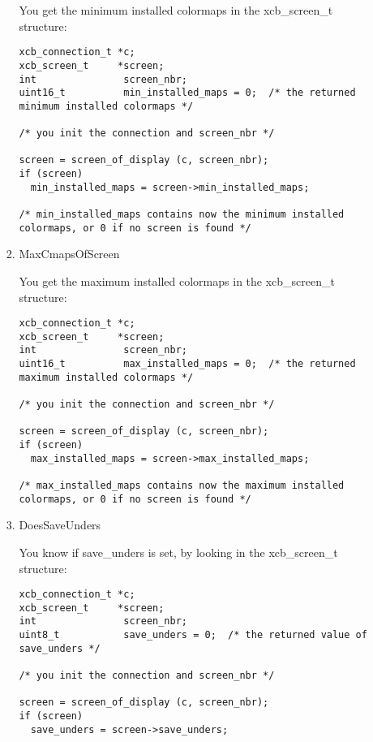 \documentclass[12pt,oneside,titlepage]{book}
\begin{document}
\begin{enumerate}
\begin{enumerate}
\begin{enumerate}
      You get the minimum installed colormaps in the {xcb\_screen\_t}
      structure:

\begin{verbatim}
xcb_connection_t *c;
xcb_screen_t     *screen;
int               screen_nbr;
uint16_t          min_installed_maps = 0;  /* the returned minimum installed colormaps */

/* you init the connection and screen_nbr */

screen = screen_of_display (c, screen_nbr);
if (screen)
  min_installed_maps = screen->min_installed_maps;

/* min_installed_maps contains now the minimum installed colormaps, or 0 if no screen is found */
\end{verbatim}
    \item
      \protect\hypertarget{MaxCmapsOfScreen}{}{}MaxCmapsOfScreen

      You get the maximum installed colormaps in the {xcb\_screen\_t}
      structure:

\begin{verbatim}
xcb_connection_t *c;
xcb_screen_t     *screen;
int               screen_nbr;
uint16_t          max_installed_maps = 0;  /* the returned maximum installed colormaps */

/* you init the connection and screen_nbr */

screen = screen_of_display (c, screen_nbr);
if (screen)
  max_installed_maps = screen->max_installed_maps;

/* max_installed_maps contains now the maximum installed colormaps, or 0 if no screen is found */
\end{verbatim}
    \item
      \protect\hypertarget{DoesSaveUnders}{}{}DoesSaveUnders

      You know if {save\_unders} is set, by looking in the
      {xcb\_screen\_t} structure:

\begin{verbatim}
xcb_connection_t *c;
xcb_screen_t     *screen;
int               screen_nbr;
uint8_t           save_unders = 0;  /* the returned value of save_unders */

/* you init the connection and screen_nbr */

screen = screen_of_display (c, screen_nbr);
if (screen)
  save_unders = screen->save_unders;


\end{verbatim}
\end{enumerate}
\end{enumerate}
\end{enumerate}
\end{document}
